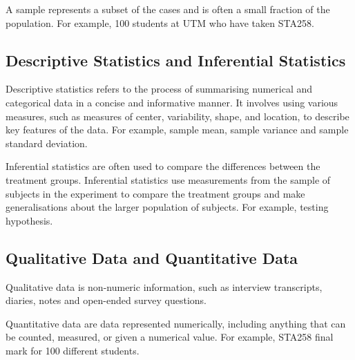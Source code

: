 \begin{definition}[Sample]	
A sample represents a subset of the cases and is often a small fraction of the population. For example, 100 students at UTM who have taken STA258.
\end{definition}

\begin{definition}	

\end{definition}

\subsection{Descriptive Statistics and Inferential Statistics}

\begin{definition}	
Descriptive statistics refers to the process of summarising numerical and categorical data in a concise and informative manner. It involves using various measures, such as measures of center, variability, shape, and location, to describe key features of the data. For example, sample mean, sample variance and sample standard deviation.
\end{definition}

\begin{definition}	
Inferential statistics are often used to compare the differences between the treatment groups. Inferential statistics use measurements from the sample of subjects in the experiment to compare the treatment groups and make generalisations about the larger population of subjects. For example, testing hypothesis.
\end{definition}

\subsection{Qualitative Data and Quantitative Data}

\begin{definition}	
Qualitative data is non-numeric information, such as interview transcripts, diaries, notes and open-ended survey questions.
\end{definition}

\begin{definition}	
Quantitative data are data represented numerically, including anything that can be counted, measured, or given a numerical value. For example, STA258 final mark for 100 different students.
\end{definition}

